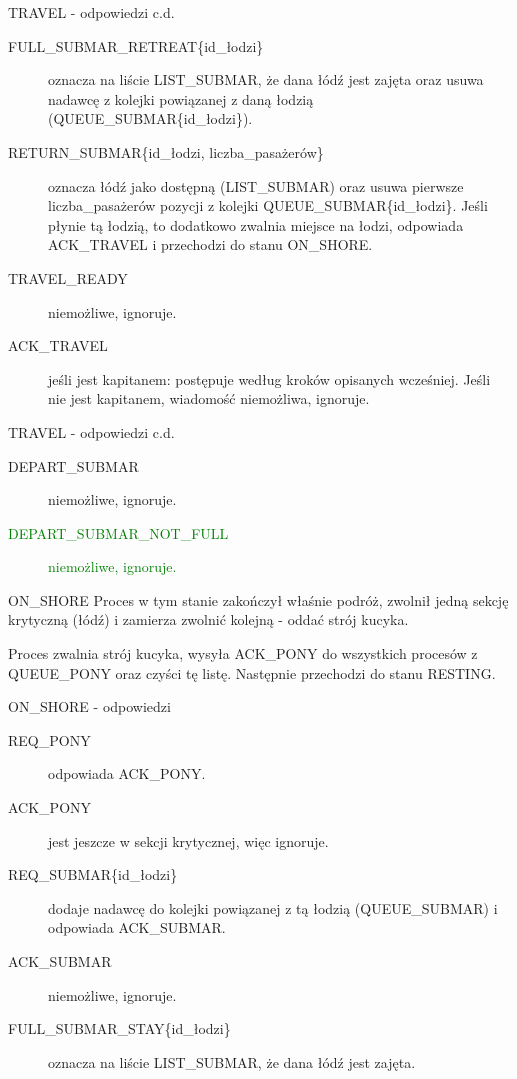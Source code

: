 \documentclass{beamer}
\begin{document}
\begin{frame}{TRAVEL - odpowiedzi c.d.}
    \internallinenumbers
    \resetlinenumber[1]
    \begin{description}
        \item [FULL\_SUBMAR\_RETREAT\{id\_łodzi\}] oznacza na liście LIST\_SUBMAR, że dana łódź jest zajęta oraz usuwa nadawcę z kolejki powiązanej z daną łodzią (QUEUE\_SUBMAR\{id\_łodzi\}).
        \item [RETURN\_SUBMAR\{id\_łodzi, liczba\_pasażerów\}] oznacza łódź jako dostępną (LIST\_SUBMAR) oraz usuwa pierwsze liczba\_pasażerów pozycji z kolejki QUEUE\_SUBMAR\{id\_łodzi\}. Jeśli płynie tą łodzią, to dodatkowo zwalnia miejsce na łodzi, odpowiada ACK\_TRAVEL i przechodzi do stanu ON\_SHORE.
        \item [TRAVEL\_READY] niemożliwe, ignoruje.
        \item [ACK\_TRAVEL] jeśli jest kapitanem: postępuje według kroków opisanych wcześniej. Jeśli nie jest kapitanem, wiadomość niemożliwa, ignoruje.
    \end{description}
\end{frame}

\begin{frame}{TRAVEL - odpowiedzi c.d.}
    \internallinenumbers
    \resetlinenumber[1]
    \begin{description}
        \item [DEPART\_SUBMAR] niemożliwe, ignoruje.
        \item [\textcolor{green}{DEPART\_SUBMAR\_NOT\_FULL}] \textcolor{green}{niemożliwe, ignoruje.}
    \end{description}
\end{frame}

\begin{frame}{ON\_SHORE}
    \internallinenumbers
    \resetlinenumber[1]
    Proces w tym stanie zakończył właśnie podróż, zwolnił jedną sekcję krytyczną (łódź) i zamierza zwolnić kolejną - oddać strój kucyka.
    
    \vspace{0.4cm}
    Proces zwalnia strój kucyka, wysyła ACK\_PONY do wszystkich procesów z QUEUE\_PONY oraz czyści tę listę. Następnie przechodzi do stanu RESTING.
\end{frame}

\begin{frame}{ON\_SHORE - odpowiedzi}
    \internallinenumbers
    \resetlinenumber[1]
    \begin{description}
        \item [REQ\_PONY] odpowiada ACK\_PONY.
        \item [ACK\_PONY] jest jeszcze w sekcji krytycznej, więc ignoruje.
        \item [REQ\_SUBMAR\{id\_łodzi\}] dodaje nadawcę do kolejki powiązanej z tą łodzią (QUEUE\_SUBMAR) i odpowiada ACK\_SUBMAR.
        \item [ACK\_SUBMAR] niemożliwe, ignoruje.
        \item [FULL\_SUBMAR\_STAY\{id\_łodzi\}] oznacza na liście LIST\_SUBMAR, że dana łódź jest zajęta.
    \end{description}
\end{frame}
\end{document}
